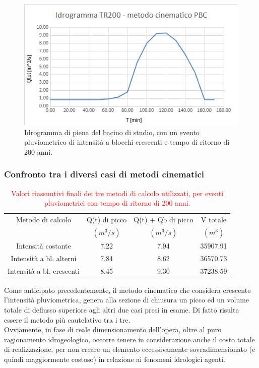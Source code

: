 \begin{figure}[H]  \centering
    \includegraphics[scale=0.8]{immagini/metodo_cinematico_p_b_crescenti.png}
    \caption{Idrogramma di piena del bacino di studio, con un evento pluviometrico di intensità a blocchi crescenti e tempo di ritorno di 200 anni.}
    \label{metodo_cinematico_p_b_crescenti}
\end{figure}    

\subsubsection{Confronto tra i diversi casi di metodi cinematici}

\begin{table}[H] \centering
    \caption{\textcolor{red}{Valori riassuntivi finali dei tre metodi di calcolo utilizzati, per eventi pluviometrici con tempo di ritorno di 200 anni.}}
        \begin{tabular}{cccc}
        \toprule
        Metodo di calcolo & Q(t) di picco  & Q(t) + Qb  di picco & V totale    \\
         & $(m^3/s)$ & $(m^3/s)$  & $(m^3)$     \\
         \midrule
Intensità costante & 7.22 & 7.94 & 35907.91 \\
Intensità a bl. alterni & 7.84 & 8.62 & 36570.73\\
Intensità a bl. crescenti & 8.45 & 9.30 & 37238.59 \\
        \bottomrule
        \end{tabular}
        \end{table}
Come anticipato precedentemente, il metodo cinematico che considera crescente l'intensità pluviometrica, genera alla sezione di chiusura un picco ed un volume totale di deflusso superiore agli altri due casi presi in esame. Di fatto risulta essere il metodo più cautelativo tra i tre.\\
Ovviamente, in fase di reale dimensionamento dell'opera, oltre al puro ragionamento idrogeologico, occorre tenere in considerazione anche il costo totale di realizzazione, per non creare un elemento eccessivamente sovradimensionato (e quindi maggiormente costoso) in relazione ai fenomeni idrologici agenti.